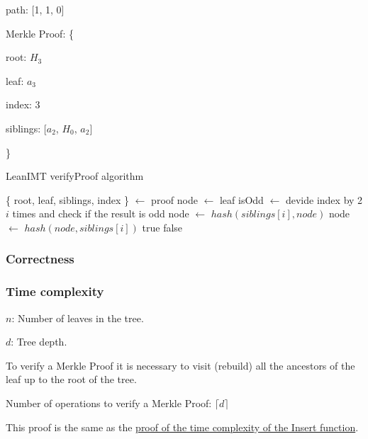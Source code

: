 \documentclass{article}
\begin{document}
path: [1, 1, 0]

Merkle Proof: \{

root: $H_3$

leaf: $a_3$

index: 3

siblings: [$a_2$, $H_0$, $a_2$]

\}





\begin{algorithm}[H]
    \caption{LeanIMT verifyProof algorithm}\label{verifyProof}
    \begin{algorithmic}[1]
        \State \{ root, leaf, siblings, index \} $\gets$ proof 
        \State node $\gets$ leaf
        \State isOdd $\gets$ devide index by 2 $i$ times and check if the result is odd
         
        \State node $\gets$ $hash(siblings[i], node)$
        \Else {}
        \State node $\gets$ $hash(node, siblings[i])$
        \EndIf
        \EndFor
        \State \Return true
        \Else
        \State \Return false
        \EndIf
        \EndProcedure
    \end{algorithmic}
\end{algorithm}



\subsubsection{Correctness}



\subsubsection{Time complexity}



$n$: Number of leaves in the tree.

$d$: Tree depth.



To verify a Merkle Proof it is necessary to visit (rebuild) all the ancestors of the leaf up to the root of the tree.



Number of operations to verify a Merkle Proof: $\lceil d \rceil$

This proof is the same as the \hyperref[InsertProof]{proof of the time complexity of the Insert function}.
\end{document}

